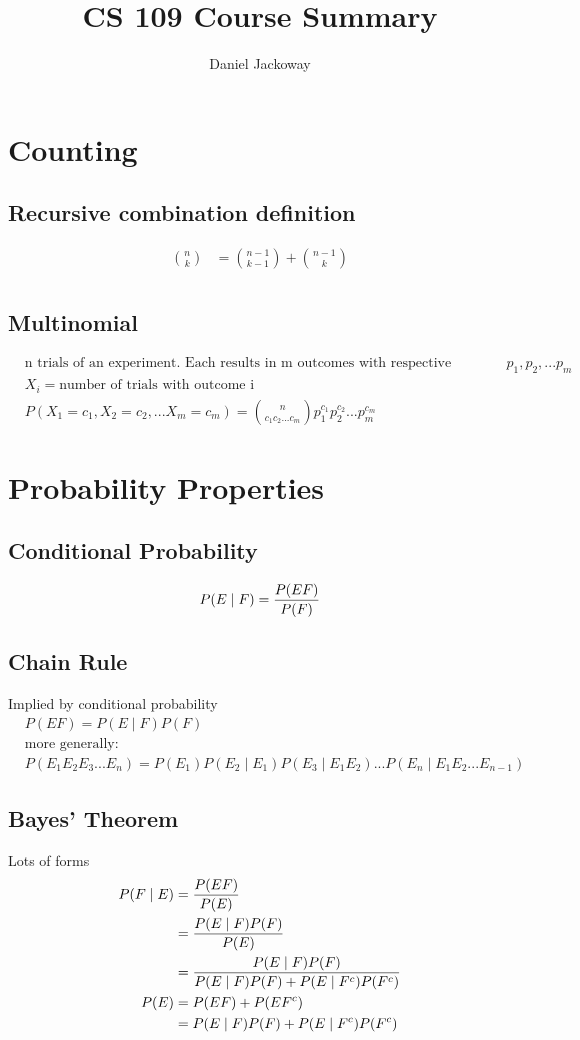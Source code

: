 \documentclass[12pt]{amsart}
\title{CS 109 Course Summary}
\author{Daniel Jackoway}
\begin{document}
\maketitle

\section{Counting}
\subsection{Recursive combination definition}
\begin{align*}
{n \choose k} &= {n-1 \choose k-1} + {n-1 \choose k} \\
\end{align*}

\subsection{Multinomial}
\begin{align*}
&\text{n trials of an experiment. Each results in m outcomes with respective probability } p_1,p_2, ... p_m \\
&X_i = \text{number of trials with outcome i} \\
&P(X_1 = c_1, X_2 = c_2, ... X_m = c_m) = {n \choose c_1 c_2 ... c_m} p_1^{c_1} p_2^{c_2} ... p_m^{c_m}
\end{align*}
\section{Probability Properties}
%
\subsection{Conditional Probability}
\[
P(E \mid F) = {P(EF) \over P(F)}
\]
\subsection{Chain Rule}
Implied by conditional probability
\begin{align*}
&P(EF) = P(E \mid F) P(F) \\
&\text{more generally:} \\
&P(E_1 E_2 E_3 ... E_n) = P(E_1) P(E_2 \mid E_1) P(E_3 \mid E_1 E_2) ... P(E_n \mid E_1 E_2 ... E_{n-1})
\end{align*}
%
\subsection{Bayes' Theorem} Lots of forms
\begin{align*}
P(F \mid E) &= {P(EF) \over P(E)} \\
&= {P(E \mid F) P(F) \over P(E)} \\
&= {P(E \mid F) P(F) \over P(E \mid F) P(F) + P(E \mid F^c) P(F^c)} \\
P(E) &= P(EF) + P(EF^c) \\
&= P(E \mid F) P(F) + P(E \mid F^c) P(F^c)
\end{align*}
\end{document}
